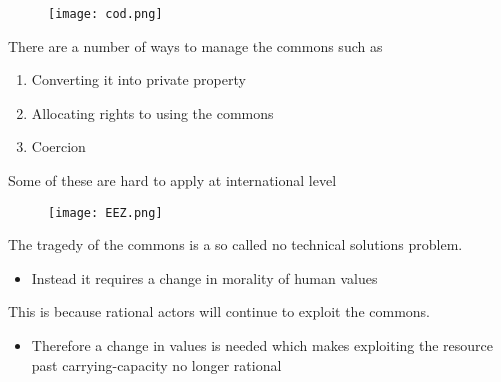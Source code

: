 \documentclass{beamer}
\begin{document}
\begin{frame}
  \begin{figure}
    \texttt{[image: cod.png]}
  \end{figure}
\end{frame}

\begin{frame}
  There are a number of ways to manage the commons such as
  \begin{enumerate}
    \item Converting it into private property
    \item Allocating rights to using the commons
    \item Coercion
  \end{enumerate}
  \medskip
  Some of these are hard to apply at international level
\end{frame}

\begin{frame}
  \begin{figure}
    \texttt{[image: EEZ.png]}
  \end{figure}
\end{frame}

\begin{frame}
  The tragedy of the commons is a so called no technical solutions problem.
  \begin{itemize}
    \item Instead it requires a change in morality of human values
  \end{itemize}
  \medskip
  This is because rational actors will continue to exploit the commons.
  \begin{itemize}
    \item Therefore a change in values is needed which makes exploiting the resource past carrying-capacity no longer rational
  \end{itemize}
\end{frame}

\end{document}

